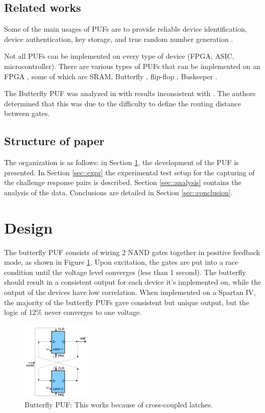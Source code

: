 \subsection{Related works}

	Some of the main usages of PUFs are to provide reliable device identification, device authentication, key storage, and true random number generation \cite{tehranipoor2011introduction}. 

	Not all PUFs can be implemented on every type of device (FPGA, ASIC, microcontroller). There are various types of PUFs that can be implemented on an FPGA \cite{VanHerrewege2015}, some of which are SRAM, Butterfly \cite{Kumar2008}, flip-flop \cite{Maes2008,Leest2010}, Buskeeper \cite{Simons2012}. 

	The Butterfly PUF was analyzed in \cite{morozov2010analysis} with results inconsistent with \cite{Kumar2008}. The authors determined that this was due to the difficulty to define the routing distance between gates. 


\subsection{Structure of paper}
	The organization is as follows: in Section \ref{sec::des_impl}, the development of the PUF is presented.  In Section \ref{sec::expr} the experimental test setup for the capturing of the challenge response pairs is described. Section \ref{sec::analysis} contains the analysis of the data. Conclusions are detailed in Section \ref{sec::conclusion}. 


\section{Design} \label{sec::des_impl}
	The butterfly PUF consists of wiring 2 NAND gates together in positive feedback mode, as shown in Figure \ref{fig:bfly}. Upon excitation, the gates are put into a race condition until the voltage level converges (less than 1 second). The butterfly should result in a consistent output for each device it's implemented on, while the output of the devices have low correlation. When implemented on a Spartan IV, the majority of the butterfly PUFs gave consistent but unique output, but the logic of 12\% never converges to one voltage. 
		\begin{figure}[tbph]
			\centering
			\includegraphics[width=0.3\textwidth]{bfly.png}
			\caption{Butterfly PUF: This works because of cross-coupled latches.}\label{fig:bfly}
		\end{figure}

